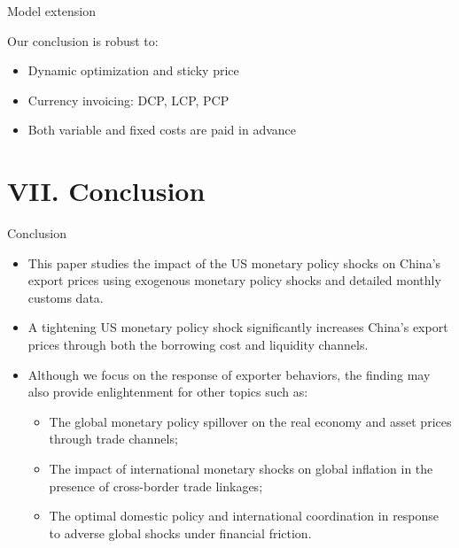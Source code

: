 \documentclass[10pt]{beamer}
\begin{document}
\begin{frame}[label=model_extension]{Model extension}
\fontsize{11}{11}\selectfont

Our conclusion is robust to:
\medskip

\begin{itemize}
    \item Dynamic optimization and sticky price
    \medskip
    \item Currency invoicing: DCP, LCP, PCP
    \medskip
    \item Both variable and fixed costs are paid in advance
\end{itemize}

\hyperlink{appendix_model_extension}{}

\end{frame}








\section{VII. Conclusion}

\begin{frame}{Conclusion}

\begin{itemize}
\item This paper studies the impact of the US monetary policy shocks on China's export prices using exogenous monetary policy shocks and detailed monthly customs data. 
\item A tightening US monetary policy shock significantly increases China's export prices through both the borrowing cost and liquidity channels.
\item Although we focus on the response of exporter behaviors, the finding may also provide enlightenment for other topics such as:
    \begin{itemize}
        \item The global monetary policy spillover on the real economy and asset prices through trade channels;
        \item The impact of international monetary shocks on global inflation in the presence of cross-border trade linkages;
        \item The optimal domestic policy and international coordination in response to adverse global shocks under financial friction.
    \end{itemize}
\end{itemize}

\end{frame}
\end{document}
